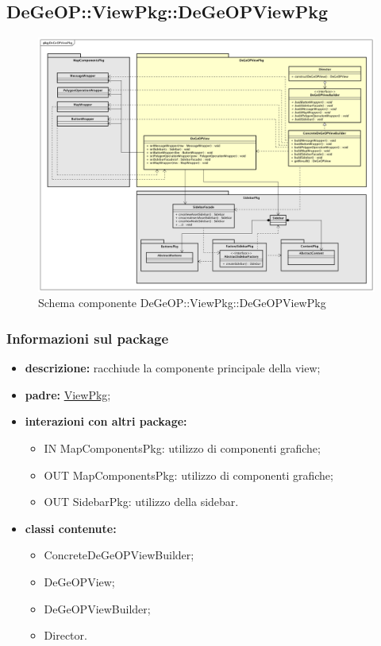 \subsection{DeGeOP::ViewPkg::DeGeOPViewPkg}
\label{pkg::DeGeOPViewPkg}
\begin{figure}[H]
	\centering
	\includegraphics[width=\textwidth]{img/PkgDiagram/DeGeOPViewPkg.png}
	\caption{Schema componente DeGeOP::ViewPkg::DeGeOPViewPkg}
\end{figure}
\subsubsection{Informazioni sul package}
\begin{itemize}
	\item \textbf{descrizione:} racchiude la componente principale della view;
	\item \textbf{padre:} \hyperref[pkg::ViewPkg]{ViewPkg};
	\item \textbf{interazioni con altri package:} 
	\begin{itemize}
		\item IN MapComponentsPkg: utilizzo di componenti grafiche;
		\item OUT MapComponentsPkg: utilizzo di componenti grafiche;
		\item OUT SidebarPkg: utilizzo della sidebar.
	\end{itemize}
	\item \textbf{classi contenute:}
	\begin{itemize}
		\item ConcreteDeGeOPViewBuilder;
		\item DeGeOPView;
		\item DeGeOPViewBuilder;
		\item Director.
	\end{itemize}
\end{itemize}
